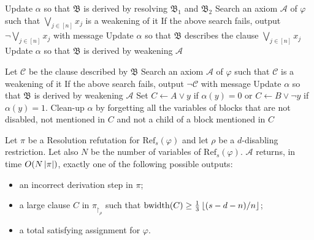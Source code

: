 \begin{breakablealgorithm}
\begin{algorithmic}
                        \State Update $\alpha$ so that $\mathfrak{B}$ is derived by resolving $\mathfrak{B}_1$ and $\mathfrak{B}_2$
                    \EndIf
                        \State Search an axiom $\mathscr{A}$ of $\varphi$ such that $\bigvee_{j \in [n]} x_j$ is a weakening of it
                        \State If the above search fails, output $\lnot \bigvee_{j \in [n]} x_j$ with message 
                        \State Update $\alpha$ so that $\mathfrak{B}$ describes the clause $\bigvee_{j \in [n]} x_j$
                        \State Update $\alpha$ so that $\mathfrak{B}$ is derived by weakening $\mathscr{A}$
                        
                        \State Let $\mathscr{C}$ be the clause described by $\mathfrak{B}$
                        \State Search an axiom $\mathscr{A}$ of $\varphi$ such that $\mathscr{C}$ is a weakening of it
                        \State If the above search fails, output $\lnot \mathscr{C}$ with message 
                        \State Update $\alpha$ so that $\mathfrak{B}$ is derived by weakening $\mathscr{A}$
                    \EndIf
                \EndIf
                \State Set $C \gets A \lor y$ if $\alpha(y) = 0$ or $C \gets B \lor \lnot y$ if $\alpha(y) = 1$.
            \EndIf
            \State Clean-up $\alpha$ by forgetting all the variables of blocks that are not disabled, not mentioned in $C$ and not a child of a block mentioned in $C$
        \EndWhile
    \end{algorithmic}
\end{breakablealgorithm}

\newpage

\begin{lemma}
    Let $\pi$ be a Resolution refutation for $\mathrm{Ref}_s(\varphi)$ and let $\rho$ be a $d$-disabling restriction. Let also $N$ be the number of variables of $\mathrm{Ref}_s(\varphi)$.  $\mathcal{A}$ returns, in time $O(N \left|\pi\right|)$, exactly one of the following possible outputs:
    \begin{itemize}[nosep]
        \item an incorrect derivation step in $\pi$;
        \item a large clause $C$ in $\pi_{\upharpoonright_{\rho}}$ such that $\mathrm{bwidth}(C) \geq \frac{1}{3} \left \lfloor (s-d-n)/n \right \rfloor$;
        \item a total satisfying assignment for $\varphi$.
    \end{itemize}
\end{lemma}

